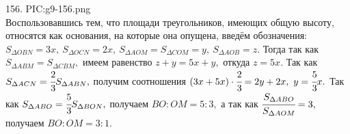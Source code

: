 156. {{PIC:g9-156.png}}\\
Воспользовавшись тем, что площади треугольников, имеющих общую высоту, относятся как основания, на которые она опущена, введём обозначения: $S_{\Delta OBN}=3x,\ S_{\Delta OCN}=2x,\ S_{\Delta AOM}=S_{\Delta COM}=y,\ S_{\Delta AOB}=z.$ Тогда так как $S_{\Delta ABM}=S_{\Delta CBM},$ имеем равенство $z+y=5x+y,$ откуда $z=5x.$ Так как $S_{\Delta ACN}=\cfrac{2}{3}S_{\Delta ABN},$ получим соотношения $(3x+5x)\cdot\cfrac{2}{3}=2y+2x,\ y=\cfrac{5}{3}x.$ Так как $S_{\Delta ABO}=\cfrac{5}{3}S_{\Delta BON},$ получаем $BO:OM=5:3,$ а так как $\cfrac{S_{\Delta ABO}}{S_{\Delta AOM}}=3,$ получаем $BO:OM=3:1.$\\
